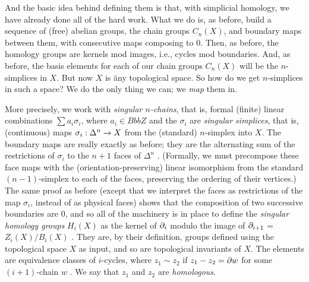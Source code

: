 \msk

And the basic idea behind defining them is that, with simplicial homology,
we have already done all of the hard work. What we do is, as before, build a 
sequence of (free) abelian groups, the chain groups $C_n(X)$, 
and boundary maps between them,
with consecutive maps composing to 0. Then, as before, the homology groups are
kernels mod images, i.e., cycles mod boundaries. And, as before, the basis
elements for each of our chain groups $C_n(X)$ will be the $n$-simplices
in $X$. But now $X$ is \u{any} topological space. So how do we get $n$-simplices
in such a space? We do the only thing we can; we {\it map} them in. 

\msk

More precisely, we work with {\it singular $n$-chains}, that is,
formal (finite) linear combinations $\sum a_i\sigma_i$, where $a_i\in{Bbb Z}$
and the $\sigma_i$ are {\it singular simplices}, that is, (continuous) 
maps $\sigma_i:\Delta^n\rightarrow X$ from the (standard) $n$-simplex into $X$.
The boundary maps are really exactly as before; they are the alternating sum of
the restrictions of $\sigma_i$ to the $n+1$ faces of $\Delta^n$ . (Formally,
we must precompose these face maps with the (orientation-preserving) linear
isomorphism from the standard $(n-1)$-simplex to each of the faces, preserving
the ordering of their vertices.) The same proof as before (except that we interpret
the faces as restrictions of the map $\sigma_i$, instead of as physical faces)
shows that the composition of two successive boundaries are 0,
and so all of the machinery is in place to define the {\it singular homology
groups} $H_i(X)$ as the kernel of $\partial_i$ modulo the image of $\partial_{i+1}$ = $Z_i(X)/B_i(X)$ .
They are, by their definition, groups defined using the topological space $X$ as input,
and so are topological invariants of $X$. The elements are equivalence classes of $i$-cycles,
where $z_1\sim z_2$ if $z_1-z_2=\partial w$ for some $(i+1)$-chain $w$ . We say that $z_1$ and $z_2$ are
{\it homologous}.

\msk

